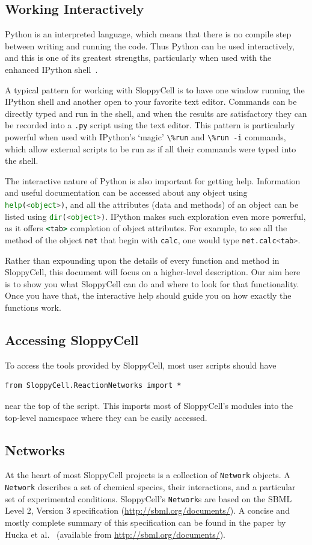 \documentclass[12pt]{article}
\makeatletter
\newcommand{\py}[1]{\lstinline[language=Python, showstringspaces=False]@#1@}
\newcommand{\shell}[1]{\lstinline[language=csh, showstringspaces=False]!#1!}
\makeatother
\begin{document}
\subsection{Working Interactively}
Python is an interpreted language, which means that there is no compile step between writing and running the code.
Thus Python can be used interactively, and this is one of its greatest strengths, particularly when used with the enhanced IPython shell~\cite{bib:Perez2007}.

A typical pattern for working with SloppyCell is to have one window running the IPython shell and another open to your favorite text editor.
Commands can be directly typed and run in the shell, and when the results are satisfactory they can be recorded into a \shell{.py} script using the text editor.
This pattern is particularly powerful when used with IPython's `magic' \shell{\%run} and \shell{\%run -i} commands, which allow external scripts to be run as if all their commands were typed into the shell.

The interactive nature of Python is also important for getting help.
Information and useful documentation can be accessed about any object using \py{help(<object>)}, and all the attributes (data and methods) of an object can be listed using \py{dir(<object>)}.
IPython makes such exploration even more powerful, as it offers \shell{<tab>} completion of object attributes.
For example, to see all the method of the object \py{net} that begin with \py{calc}, one would type \py{net.calc<tab>}.  

Rather than expounding upon the details of every function and method in SloppyCell, this document will focus on a higher-level description.
Our aim here is to show you what SloppyCell can do and where to look for that functionality.
Once you have that, the interactive help should guide you on how exactly the functions work.

\subsection{Accessing SloppyCell}
To access the tools provided by SloppyCell, most user scripts should have
\begin{lstlisting}
from SloppyCell.ReactionNetworks import *
\end{lstlisting}
near the top of the script.
This imports most of SloppyCell's modules into the top-level namespace where they can be easily accessed.

\subsection{Networks}
At the heart of most SloppyCell projects is a collection of \py{Network} objects.
A \py{Network} describes a set of chemical species, their interactions, and a particular set of experimental conditions.
SloppyCell's \py{Network}s are based on the SBML Level 2, Version 3 specification (\url{http://sbml.org/documents/}).
A concise and mostly complete summary of this specification can be found in the paper by Hucka et al.~\cite{bib:Hucka2003} (available from \url{http://sbml.org/documents/}).
\end{document}
